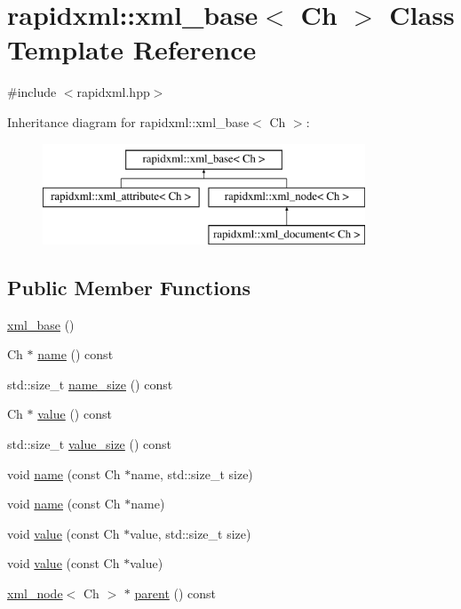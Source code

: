 \hypertarget{classrapidxml_1_1xml__base}{
\section{rapidxml::xml\_\-base$<$ Ch $>$ Class Template Reference}
\label{d4/d48/classrapidxml_1_1xml__base}
}


{\ttfamily \#include $<$rapidxml.hpp$>$}

Inheritance diagram for rapidxml::xml\_\-base$<$ Ch $>$:\begin{figure}[H]
\begin{center}
\leavevmode
\includegraphics[height=3.000000cm]{d4/d48/classrapidxml_1_1xml__base}
\end{center}
\end{figure}
\subsection*{Public Member Functions}
\begin{DoxyCompactItemize}
\item 
\hyperlink{classrapidxml_1_1xml__base_a23e7f7aac02d17a0a01afb597e4b966b}{xml\_\-base} ()
\item 
Ch $\ast$ \hyperlink{classrapidxml_1_1xml__base_a9a09739310469995db078ebd0da3ed45}{name} () const 
\item 
std::size\_\-t \hyperlink{classrapidxml_1_1xml__base_a7e7f98b3d01e1eab8dc1ca69aad9af84}{name\_\-size} () const 
\item 
Ch $\ast$ \hyperlink{classrapidxml_1_1xml__base_adcdaccff61c665f039d9344e447b7445}{value} () const 
\item 
std::size\_\-t \hyperlink{classrapidxml_1_1xml__base_a9fcf201ed0915ac18dd43b0b5dcfaf32}{value\_\-size} () const 
\item 
void \hyperlink{classrapidxml_1_1xml__base_ae55060ae958c6e6465d6c8db852ec6ce}{name} (const Ch $\ast$name, std::size\_\-t size)
\item 
void \hyperlink{classrapidxml_1_1xml__base_a4611ddc82ac83a527c65606600eb2a0d}{name} (const Ch $\ast$name)
\item 
void \hyperlink{classrapidxml_1_1xml__base_a3b183c2db7022a6d30494dd2f0ac11e9}{value} (const Ch $\ast$value, std::size\_\-t size)
\item 
void \hyperlink{classrapidxml_1_1xml__base_a81e63ec4bfd2d7ef0a6c2ed49be6e623}{value} (const Ch $\ast$value)
\item 
\hyperlink{classrapidxml_1_1xml__node}{xml\_\-node}$<$ Ch $>$ $\ast$ \hyperlink{classrapidxml_1_1xml__base_a7f31ae930f93852830234db1ae59c4c4}{parent} () const 
\end{DoxyCompactItemize}
